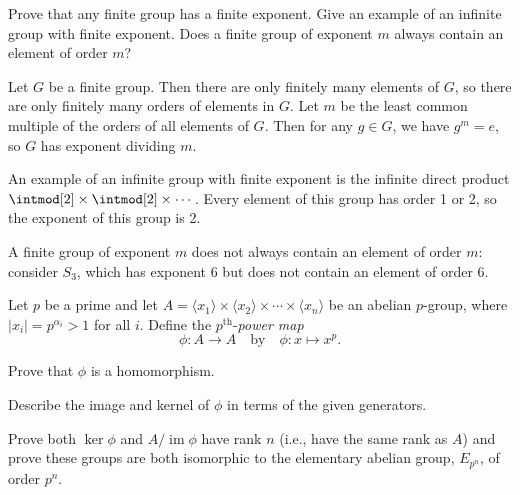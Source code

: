 \begin{exercise}\label{ex5.2.6}
    Prove that any finite group has a finite exponent. Give an example of an infinite group with finite exponent. Does a finite group of exponent $m$ always contain an element of order $m$?
\end{exercise}

\begin{sol}
    Let $G$ be a finite group. Then there are only finitely many elements of $G$, so there are only finitely many orders of elements in $G$. Let $m$ be the least common multiple of the orders of all elements of $G$. Then for any $g \in G$, we have $g^m = e$, so $G$ has exponent dividing $m$.
    
    An example of an infinite group with finite exponent is the infinite direct product $\intmod[2] \times \intmod[2] \times \cdots$. Every element of this group has order 1 or 2, so the exponent of this group is 2.
    
    A finite group of exponent $m$ does not always contain an element of order $m$: consider $S_3$, which has exponent 6 but does not contain an element of order 6.
\end{sol}

\begin{exercise}\label{ex5.2.7}
    Let $p$ be a prime and let $A = \langle x_1 \rangle \times \langle x_2 \rangle \times \cdots \times \langle x_n \rangle$ be an abelian $p$-group, where $|x_i| = p^{\alpha_i} > 1$ for all $i$. Define the $p^{\text{th}}$-\emph{power map}
    \[\phi : A \to A \quad \text{by} \quad \phi : x \mapsto x^p.\]
    \begin{subproblems}
        \item Prove that $\phi$ is a homomorphism.
        \item Describe the image and kernel of $\phi$ in terms of the given generators.
        \item Prove both $\ker \phi$ and $A / \operatorname{im} \phi$ have rank $n$ (i.e., have the same rank as $A$) and prove these groups are both isomorphic to the elementary abelian group, $E_{p^n}$, of order $p^n$.
    \end{subproblems}
\end{exercise}

